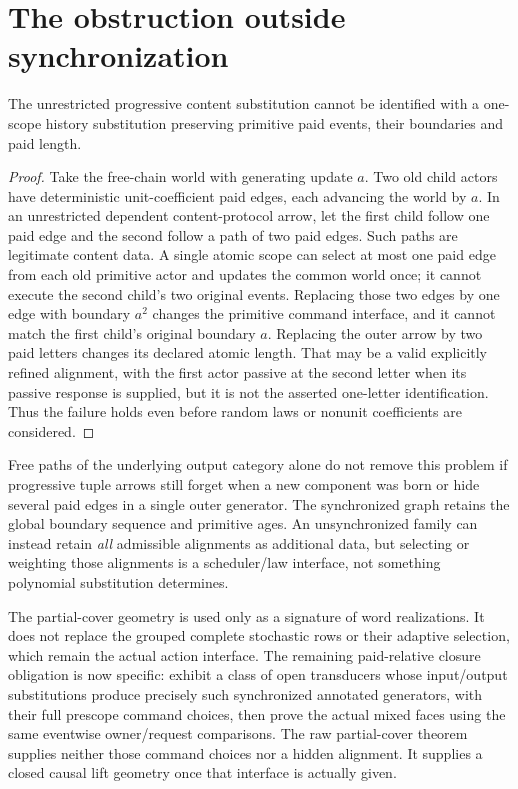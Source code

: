 \documentclass[11pt]{article}
\begin{document}
\section{The obstruction outside synchronization}
\begin{proposition}
The unrestricted progressive content substitution cannot be identified with a one-scope history substitution preserving primitive paid events, their boundaries and paid length.
\end{proposition}
\begin{proof}
Take the free-chain world with generating update $a$. Two old child actors have deterministic unit-coefficient paid edges, each advancing the world by $a$. In an unrestricted dependent content-protocol arrow, let the first child follow one paid edge and the second follow a path of two paid edges. Such paths are legitimate content data. A single atomic scope can select at most one paid edge from each old primitive actor and updates the common world once; it cannot execute the second child's two original events. Replacing those two edges by one edge with boundary $a^2$ changes the primitive command interface, and it cannot match the first child's original boundary $a$. Replacing the outer arrow by two paid letters changes its declared atomic length. That may be a valid explicitly refined alignment, with the first actor passive at the second letter when its passive response is supplied, but it is not the asserted one-letter identification. Thus the failure holds even before random laws or nonunit coefficients are considered.\end{proof}

Free paths of the underlying output category alone do not remove this problem if progressive tuple arrows still forget when a new component was born or hide several paid edges in a single outer generator. The synchronized graph retains the global boundary sequence and primitive ages. An unsynchronized family can instead retain \emph{all} admissible alignments as additional data, but selecting or weighting those alignments is a scheduler/law interface, not something polynomial substitution determines.

The partial-cover geometry is used only as a signature of word realizations. It does not replace the grouped complete stochastic rows or their adaptive selection, which remain the actual action interface. The remaining paid-relative closure obligation is now specific: exhibit a class of open transducers whose input/output substitutions produce precisely such synchronized annotated generators, with their full prescope command choices, then prove the actual mixed faces using the same eventwise owner/request comparisons. The raw partial-cover theorem supplies neither those command choices nor a hidden alignment. It supplies a closed causal lift geometry once that interface is actually given.
\end{document}
